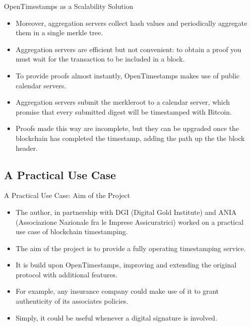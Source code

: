 \documentclass[usenames,dvipsnames]{beamer}
\begin{document}
    \begin{frame}{OpenTimestamps as a Scalability Solution}
        \begin{itemize}
            \item Moreover, \alert{aggregation servers} collect hash values and periodically \alert{aggregate} them in a single merkle tree.
            \item Aggregation servers are \alert{efficient} but \alert{not convenient}: to obtain a proof you must wait for the transaction to be included in a block.
            \item To provide proofs almost \alert{instantly}, OpenTimestamps makes use of \alert{public calendar servers}.
            \item Aggregation servers submit the merkleroot to a calendar server, which \alert{promise} that every submitted digest will be timestamped with Bitcoin.
            \item Proofs made this way are \alert{incomplete}, but they can be \alert{upgraded} once the blockchain has completed the timestamp, \alert{adding} the path up the the \alert{block header}.
        \end{itemize}
    \end{frame}
    
    \subsection{A Practical Use Case}
    
    \begin{frame}{A Practical Use Case: Aim of the Project }
        \begin{itemize}
            \item The author, in partnership with \alert{DGI} (Digital Gold Institute) and \alert{ANIA} (Associazione Nazionale fra le Imprese Assicuratrici) worked on a \alert{practical use case} of blockchain timestamping.
            \item The aim of the project is to provide a fully operating \alert{timestamping service}.
            \item It is build upon OpenTimestamps, \alert{improving} and \alert{extending} the original protocol with additional features.
            \item For example, any insurance company could make use of it to grant \alert{authenticity} of its associates policies.
            \item Simply, it could be useful whenever a \alert{digital signature} is involved.
        \end{itemize}
    \end{frame}
    
\end{document}
